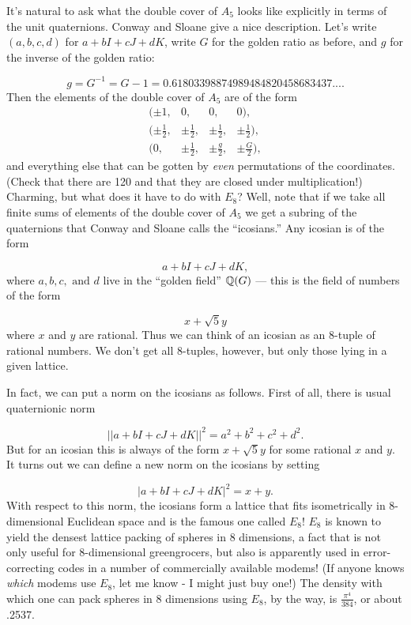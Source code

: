 It's natural to ask what the double cover of $A_5$ looks like explicitly in terms of the unit quaternions. Conway and Sloane give a nice description. Let's write $(a,b,c,d)$ for $a + bI + cJ + dK$, write $G$ for the golden ratio as before, and $g$ for the inverse of the golden ratio:

\[ g = G^{-1} = G - 1 = 0.61803398874989484820458683437....\]
Then the elements of the double cover of $A_5$ are of the form
\[
\begin{array}{lccr}
(\pm 1, & 0, & 0, & 0),\\[1ex]
(\pm \frac{1}{2}, & \pm \frac{1}{2}, & \pm \frac{1}{2}, & \pm \frac{1}{2}),\\[1ex]
(    0, & \pm \frac{1}{2}, & \pm \frac{g}{2}, & \pm \frac{G}{2}),
\end{array}
\]
and everything else that can be gotten by \emph{even} permutations of the coordinates. (Check that there are 120 and that they are closed under multiplication!)
Charming, but what does it have to do with $E_8$? Well, note that if we take all finite sums of elements of the double cover of $A_5$ we get a subring of the quaternions that Conway and Sloane calls the ``icosians.'' Any icosian is of the form

\[           a + bI + cJ + dK,\]
where $a,b,c,\text{ and }d$ live in the ``golden field'' $\mathbb Q(G)$ --- this is the field of numbers of the form

\[            x + \sqrt{5} y\]
where $x$ and $y$ are rational. Thus we can think of an icosian as an 8-tuple of rational numbers. We don't get all 8-tuples, however, but only those lying in a given lattice.

In fact, we can put a norm on the icosians as follows. First of all, there is usual quaternionic norm

\[          ||a + bI + cJ + dK||^2 = a^2 + b^2 + c^2 + d^2. \]
But for an icosian this is always of the form $x + \sqrt{5} y$ for some rational $x$ and $y$. It turns out we can define a new norm on the icosians by setting

\[          |a + bI + cJ + dK|^2 = x + y.\]
With respect to this norm, the icosians form a lattice that fits isometrically in 8-dimensional Euclidean space and is the famous one called $E_8$! $E_8$ is known to yield the densest lattice packing of spheres in 8 dimensions, a fact that is not only useful for 8-dimensional greengrocers, but also is apparently used in error-correcting codes in a number of commercially available modems! (If anyone knows \emph{which} modems use $E_8$, let me know - I might just buy one!) The density with which one can pack spheres in 8 dimensions using $E_8$, by the way, is $\frac{\pi^4}{384}$, or about .2537.

